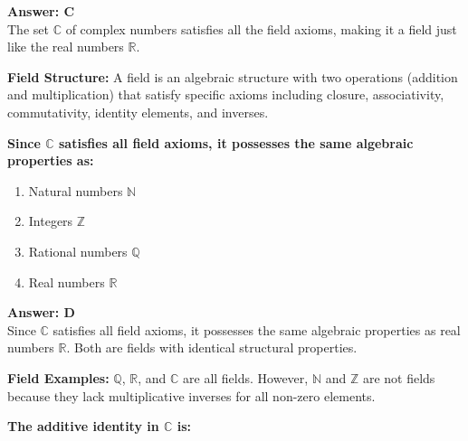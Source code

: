 \documentclass[12pt,a4paper]{article}
\begin{document}
\begin{answerstyle}
\textbf{Answer: C} \\
The set \( \mathbb{C} \) of complex numbers satisfies all the field axioms, making it a field just like the real numbers \( \mathbb{R} \).
\end{answerstyle}

\begin{conceptbox}
\textbf{Field Structure:} A field is an algebraic structure with two operations (addition and multiplication) that satisfy specific axioms including closure, associativity, commutativity, identity elements, and inverses.
\end{conceptbox}

\newpage
\begin{questiontitle}[MCQ 56]
\textbf{Since \( \mathbb{C} \) satisfies all field axioms, it possesses the same algebraic properties as:}
\end{questiontitle}

\begin{partbox}[Options]
\begin{enumerate}[label=\Alph*.]
    \item Natural numbers \( \mathbb{N} \)
    \item Integers \( \mathbb{Z} \)
    \item Rational numbers \( \mathbb{Q} \)
    \item Real numbers \( \mathbb{R} \)
\end{enumerate}
\end{partbox}

\begin{answerstyle}
\textbf{Answer: D} \\
Since \( \mathbb{C} \) satisfies all field axioms, it possesses the same algebraic properties as real numbers \( \mathbb{R} \). Both are fields with identical structural properties.
\end{answerstyle}

\begin{conceptbox}
\textbf{Field Examples:} \( \mathbb{Q} \), \( \mathbb{R} \), and \( \mathbb{C} \) are all fields. However, \( \mathbb{N} \) and \( \mathbb{Z} \) are not fields because they lack multiplicative inverses for all non-zero elements.
\end{conceptbox}

\newpage
\begin{questiontitle}[MCQ 57]
\textbf{The additive identity in \( \mathbb{C} \) is:}
\end{questiontitle}
\end{document}
